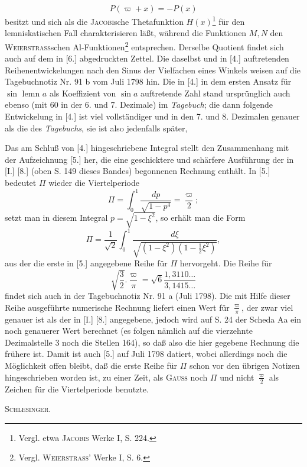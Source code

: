 \[P(\varpi+x)=-P(x)\]
\clearpage
{}\fancyhead{}
\noindent besitzt und sich als die \textsc{Jacobi}sche Thetafunktion \(H(x)\)\renewcommand{\thefootnote}{*)}\footnote{Vergl. etwa \textsc{Jacobis} Werke I, S. 224.} für den lemniskatischen Fall charakterisieren läßt, während die Funktionen \(M,N\) den \textsc{Weierstrass}schen Al-Funktionen\renewcommand{\thefootnote}{**)}\footnote{Vergl. \textsc{Weierstrass}' Werke I, S. 6.\ClosingRule} entsprechen. Derselbe Quotient findet sich auch auf dem in [6.] abgedruckten Zettel. Die daselbst und in [4.] auftretenden Reihenentwickelungen nach den Sinus der Vielfachen eines Winkels weisen auf die Tagebuchnotiz Nr. 91 b vom Juli 1798 hin. Die in [4.] in dem ersten Ansatz für \(\sin\text{ lemn }a\) als Koeffizient von \(\sin a\) auftretende Zahl stand ursprünglich auch ebenso (mit 60 in der 6. und 7. Dezimale) im \textit{Tagebuch}; die dann folgende Entwickelung in [4.] ist viel vollständiger und in den 7. und 8. Dezimalen genauer als die des \textit{Tagebuchs}, sie ist also jedenfalls später, 

Das am Schluß von [4.] hingeschriebene Integral stellt den Zusammenhang mit der Aufzeichnung [5.] her, die eine geschicktere und schärfere Ausführung der in [I.] [8.] (oben S. 149 dieses Bandes) begonnenen Rechnung enthält. In [5.] bedeutet \(\Pi\) wieder die Viertelperiode
\[\Pi=\int_0^1\frac{dp}{\sqrt{1-p^4}}=\frac{\varpi}{2};\]
setzt man in diesem Integral \(p=\sqrt{1-\xi^2}\), so erhält man die Form
\[\Pi=\frac1{\sqrt2}\int_0^1\frac{d\xi}{\sqrt{(1-\xi^2)(1-\frac12\xi^2)}},\]
aus der die erste in [5.] angegebene Reihe für \(\Pi\) hervorgeht. Die Reihe für
\[\sqrt{\frac32}.\frac{\varpi}{\pi}=\sqrt6\frac{1{,}3110\ldots}{3{,}1415\ldots}\]
findet sich auch in der Tagebuchnotiz Nr. 91 a (Juli 1798). Die mit Hilfe dieser Reihe ausgeführte numerische Rechnung liefert einen Wert für \(\frac{\varpi}{\pi}\), der zwar viel genauer ist als der in [I.] [8.] angegebene, jedoch wird auf S. 24 der Scheda Aa ein noch genauerer Wert berechnet (es folgen nämlich auf die vierzehnte Dezimalstelle 3 noch die Stellen 164), so daß also die hier gegebene Rechnung die frühere ist. Damit ist auch [5.] auf Juli 1798 datiert, wobei allerdings noch die Möglichkeit offen bleibt, daß die erste Reihe für \(\Pi\) schon vor den übrigen Notizen hingeschrieben worden ist, zu einer Zeit, als \textsc{Gauss} noch \(\Pi\) und nicht \(\frac{\varpi}{2}\) als Zeichen für die Viertelperiode benutzte.
\begin{flushright}\textsc{Schlesinger.}\end{flushright}
\clearpage
\endgroup
